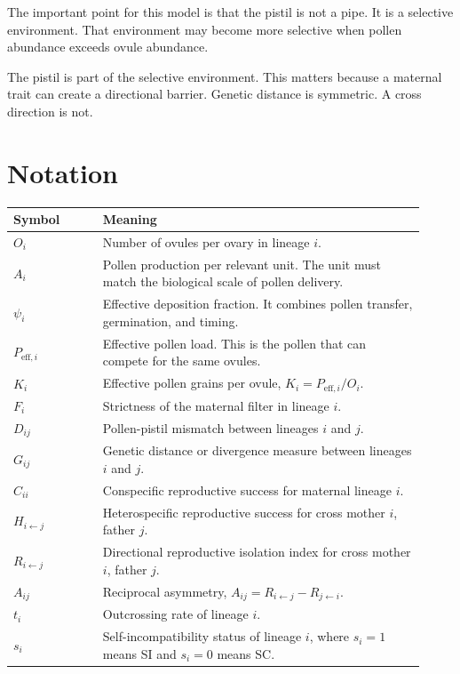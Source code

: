 \documentclass[12pt]{article}
\begin{document}
The important point for this model is that the pistil is not a pipe. It is a selective environment. That environment may become more selective when pollen abundance exceeds ovule abundance.

\begin{conclusionbox}
The pistil is part of the selective environment. This matters because a maternal trait can create a directional barrier. Genetic distance is symmetric. A cross direction is not.
\end{conclusionbox}

\section{Notation}

\begin{center}
\begin{tabular}{>{\raggedright\arraybackslash}p{0.20\linewidth} >{\raggedright\arraybackslash}p{0.72\linewidth}}
\toprule
Symbol & Meaning \\
\midrule
$O_i$ & Number of ovules per ovary in lineage $i$. \\
$A_i$ & Pollen production per relevant unit. The unit must match the biological scale of pollen delivery. \\
$\psi_i$ & Effective deposition fraction. It combines pollen transfer, germination, and timing. \\
$P_{\mathrm{eff},i}$ & Effective pollen load. This is the pollen that can compete for the same ovules. \\
$K_i$ & Effective pollen grains per ovule, $K_i=P_{\mathrm{eff},i}/O_i$. \\
$F_i$ & Strictness of the maternal filter in lineage $i$. \\
$D_{ij}$ & Pollen-pistil mismatch between lineages $i$ and $j$. \\
$G_{ij}$ & Genetic distance or divergence measure between lineages $i$ and $j$. \\
$C_{ii}$ & Conspecific reproductive success for maternal lineage $i$. \\
$H_{i\leftarrow j}$ & Heterospecific reproductive success for cross mother $i$, father $j$. \\
$R_{i\leftarrow j}$ & Directional reproductive isolation index for cross mother $i$, father $j$. \\
$A_{ij}$ & Reciprocal asymmetry, $A_{ij}=R_{i\leftarrow j}-R_{j\leftarrow i}$. \\
$t_i$ & Outcrossing rate of lineage $i$. \\
$s_i$ & Self-incompatibility status of lineage $i$, where $s_i=1$ means SI and $s_i=0$ means SC. \\
\bottomrule
\end{tabular}
\end{center}
\end{document}
